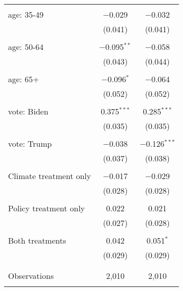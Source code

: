 \begin{tabular}{@{\extracolsep{5pt}}lcc}
  & & \\ 
 age: 35-49 & $-$0.029 & $-$0.032 \\ 
  & (0.041) & (0.041) \\ 
  & & \\ 
 age: 50-64 & $-$0.095$^{**}$ & $-$0.058 \\ 
  & (0.043) & (0.044) \\ 
  & & \\ 
 age: 65+ & $-$0.096$^{*}$ & $-$0.064 \\ 
  & (0.052) & (0.052) \\ 
  & & \\ 
 vote: Biden & 0.375$^{***}$ & 0.285$^{***}$ \\ 
  & (0.035) & (0.035) \\ 
  & & \\ 
 vote: Trump & $-$0.038 & $-$0.126$^{***}$ \\ 
  & (0.037) & (0.038) \\ 
  & & \\ 
 Climate treatment only & $-$0.017 & $-$0.029 \\ 
  & (0.028) & (0.028) \\ 
  & & \\ 
 Policy treatment only & 0.022 & 0.021 \\ 
  & (0.027) & (0.028) \\ 
  & & \\ 
 Both treatments & 0.042 & 0.051$^{*}$ \\ 
  & (0.029) & (0.029) \\ 
  & & \\ 
\hline \\[-1.8ex] 

Observations & 2,010 & 2,010 \\ 
\hline 
\hline \\[-1.8ex] 
\end{tabular} 